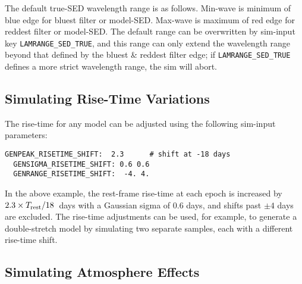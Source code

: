 \documentclass[12pt]{article}
\newcommand{\Trest}{T_{\rm rest}}
\begin{document}
The default true-SED wavelength range is as follows. Min-wave is minimum
of blue edge for bluest filter or model-SED. 
Max-wave is maximum of red edge for reddest filter or model-SED.
The default range can be overwritten by sim-input key {\tt LAMRANGE\_SED\_TRUE},
and this range can only extend the wavelength range beyond that defined
by the bluest \& reddest filter edge; if {\tt LAMRANGE\_SED\_TRUE}
defines a more strict wavelength range, the sim will abort.



\subsection{Simulating Rise-Time Variations}
\label{subsec:simRiseTime}

The rise-time for any model can be adjusted using 
the following sim-input parameters:
\begin{Verbatim}[frame=single]
  GENPEAK_RISETIME_SHIFT:  2.3      # shift at -18 days
  GENSIGMA_RISETIME_SHIFT: 0.6 0.6
  GENRANGE_RISETIME_SHIFT:  -4. 4.
\end{Verbatim}
%
In the above example, the rest-frame rise-time at each epoch
is increased by $2.3\times \Trest/18$~days
with a Gaussian sigma of 0.6 days,
and shifts past $\pm 4$ days are excluded.
The rise-time adjustments can be used, for example, 
to generate a double-stretch model by simulating 
two separate samples, each with a different 
rise-time shift.



\clearpage
\subsection{Simulating Atmosphere Effects}
\label{subsec:simAtmos}

\end{document}
